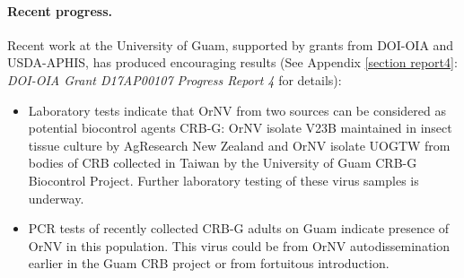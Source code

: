 \documentclass[12pt,letterpaper,english,bibliography=totocnumbered, abstract=on]{scrartcl}
\begin{document}
\paragraph{Recent progress.}
\label{recent progress}

Recent work at the University of Guam, supported by grants from DOI-OIA and USDA-APHIS, has produced encouraging results (See Appendix \ref{section report4}: \textit{DOI-OIA Grant D17AP00107 Progress Report 4} for details):

\begin{itemize}
	
\item	Laboratory tests indicate that OrNV from two sources can be considered as potential biocontrol agents CRB-G: OrNV isolate V23B maintained in insect tissue culture by AgResearch New Zealand and OrNV isolate UOGTW from bodies of CRB collected in Taiwan by the University of Guam CRB-G Biocontrol Project. Further laboratory testing of these virus samples is underway. 
	
\item	PCR tests of recently collected CRB-G adults on Guam indicate presence of OrNV in this population. This virus could be from OrNV autodissemination earlier in the Guam CRB project or from fortuitous introduction.

\end{itemize}
	
\end{document}
